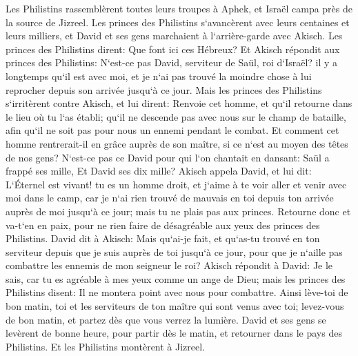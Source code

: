 \verse Les Philistins rassemblèrent toutes leurs troupes à Aphek, et Israël campa près de la source de Jizreel. 
\verse Les princes des Philistins s`avancèrent avec leurs centaines et leurs milliers, et David et ses gens marchaient à l`arrière-garde avec Akisch. 
\verse Les princes des Philistins dirent: Que font ici ces Hébreux? Et Akisch répondit aux princes des Philistins: N`est-ce pas David, serviteur de Saül, roi d`Israël? il y a longtemps qu`il est avec moi, et je n`ai pas trouvé la moindre chose à lui reprocher depuis son arrivée jusqu`à ce jour. 
\verse Mais les princes des Philistins s`irritèrent contre Akisch, et lui dirent: Renvoie cet homme, et qu`il retourne dans le lieu où tu l`as établi; qu`il ne descende pas avec nous sur le champ de bataille, afin qu`il ne soit pas pour nous un ennemi pendant le combat. Et comment cet homme rentrerait-il en grâce auprès de son maître, si ce n`est au moyen des têtes de nos gens? 
\verse N`est-ce pas ce David pour qui l`on chantait en dansant: Saül a frappé ses mille, Et David ses dix mille? 
\verse Akisch appela David, et lui dit: L`Éternel est vivant! tu es un homme droit, et j`aime à te voir aller et venir avec moi dans le camp, car je n`ai rien trouvé de mauvais en toi depuis ton arrivée auprès de moi jusqu`à ce jour; mais tu ne plais pas aux princes. 
\verse Retourne donc et va-t`en en paix, pour ne rien faire de désagréable aux yeux des princes des Philistins. 
\verse David dit à Akisch: Mais qu`ai-je fait, et qu`as-tu trouvé en ton serviteur depuis que je suis auprès de toi jusqu`à ce jour, pour que je n`aille pas combattre les ennemis de mon seigneur le roi? 
\verse Akisch répondit à David: Je le sais, car tu es agréable à mes yeux comme un ange de Dieu; mais les princes des Philistins disent: Il ne montera point avec nous pour combattre. 
\verse Ainsi lève-toi de bon matin, toi et les serviteurs de ton maître qui sont venus avec toi; levez-vous de bon matin, et partez dès que vous verrez la lumière. 
\verse David et ses gens se levèrent de bonne heure, pour partir dès le matin, et retourner dans le pays des Philistins. Et les Philistins montèrent à Jizreel. 

\chapter{}


